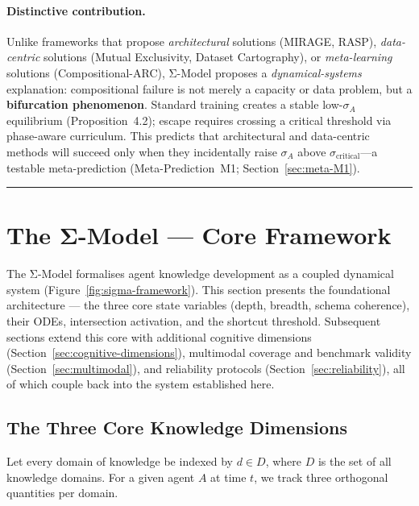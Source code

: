 \documentclass[10pt]{article}
\begin{document}
\paragraph{Distinctive contribution.}
Unlike frameworks that propose \emph{architectural} solutions (MIRAGE,
RASP), \emph{data-centric} solutions (Mutual Exclusivity, Dataset
Cartography), or \emph{meta-learning} solutions (Compositional-ARC),
Σ-Model proposes a \emph{dynamical-systems} explanation:
compositional failure is not merely a capacity or data problem, but a
\textbf{bifurcation phenomenon}. Standard training creates a stable
low-$\sigma_A$ equilibrium (Proposition~4.2); escape requires crossing
a critical threshold via phase-aware curriculum. This predicts that
architectural and data-centric methods will succeed only when they
incidentally raise $\sigma_A$ above $\sigma_{\text{critical}}$---a
testable meta-prediction (Meta-Prediction~M1; Section~\ref{sec:meta-M1}).

\noindent\rule{\linewidth}{0.4pt}

\section{The Σ-Model --- Core Framework}\label{sec:core-framework}

The Σ-Model formalises agent knowledge development as a coupled
dynamical system (Figure~\ref{fig:sigma-framework}). This section presents the foundational architecture
--- the three core state variables (depth, breadth, schema coherence),
their ODEs, intersection activation, and the shortcut threshold.
Subsequent sections extend this core with additional cognitive
dimensions (Section~\ref{sec:cognitive-dimensions}), multimodal coverage
and benchmark validity (Section~\ref{sec:multimodal}), and reliability
protocols (Section~\ref{sec:reliability}), all of which couple back into
the system established here.

\subsection{The Three Core Knowledge Dimensions}\label{sec:three-core}

Let every domain of knowledge be indexed by $d \in D$, where $D$ is the
set of all knowledge domains. For a given agent $A$ at time $t$,
we track three orthogonal quantities per domain.
\end{document}
